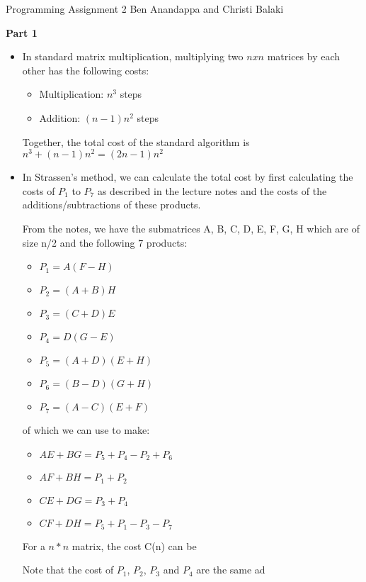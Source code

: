 \documentclass[11pt]{article}
\begin{document}
Programming Assignment 2 Ben Anandappa and Christi Balaki \newline

\textbf{Part 1}
\begin{itemize}
\item In standard matrix multiplication, multiplying two $n x n$ matrices by each other has the following costs:
\begin{itemize}
\item Multiplication: $n^3$ steps
\item Addition: $(n-1)n^2$ steps
\end{itemize}
Together, the total cost of the standard algorithm is $n^3 + (n-1)n^2 = (2n - 1)n^2$ 
\item In Strassen's method, we can calculate the total cost by first calculating the costs of $P_1$ to $P_7$ as described in the lecture notes and the costs of the additions/subtractions of these products. 

From the notes, we have the submatrices A, B, C, D, E, F, G, H which are of size n/2 and the following 7 products: 
\begin{itemize}
\item $P_1 = A(F-H)$
\item $P_2 = (A+B)H$
\item $P_3 = (C+D)E$
\item $P_4 = D(G-E)$
\item $P_5 = (A+D)(E+H)$
\item $P_6 = (B-D)(G+H)$
\item $P_7 = (A-C)(E+F)$
\end{itemize} 

of which we can use to make: 
\begin{itemize}
\item $AE + BG = P_5 + P_4 - P_2 + P_6$
\item $AF + BH = P_1 + P_2$
\item $CE + DG = P_3 + P_4$
\item $CF + DH = P_5 + P_1 - P_3 - P_7$
\end{itemize}

For a $n*n$ matrix, the cost C(n) can be

Note that the cost of $P_1$, $P_2$, $P_3$ and $P_4$ are the same ad

 \end{itemize}
\end{document}
